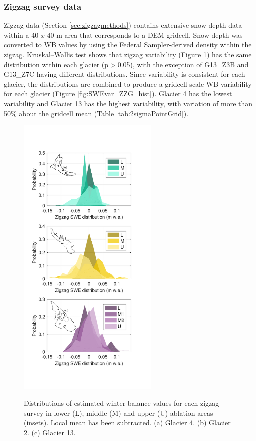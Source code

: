 \documentclass{sfuthesis}
\begin{document}
\subsubsection{Zigzag survey data}
Zigzag data (Section \ref{sec:zigzagmethods}) contains extensive snow depth data within a 40 $x$ 40 m area that corresponds to a DEM gridcell. Snow depth was converted to WB values by using the Federal Sampler-derived density within the zigzag. Kruskal--Wallis test shows that zigzag variability (Figure \ref{fig:SWEvar_ZZ_hist}) has the same distribution within each glacier (p$>$0.05), with the exception of G13\_Z3B and G13\_Z7C having different distributions. Since variability is consistent for each glacier, the distributions are combined to produce a gridcell-scale WB variability for each glacier (Figure \ref{fig:SWEvar_ZZG_hist}). Glacier 4 has the lowest variability and Glacier 13 has the highest variability, with variation of more than 50\% about the gridcell mean (Table  \ref{tab:2sigmaPointGrid}). 

\begin{figure}[H]
	\centering
	\includegraphics[width =0.6\textwidth]{ZigzagHistogram.pdf}\\
	\caption{Distributions of estimated winter-balance values for each zigzag survey in lower (L), middle (M) and upper (U) ablation areas (insets). Local mean has been subtracted. (a) Glacier 4. (b) Glacier 2. (c) Glacier 13.}
	\label{fig:SWEvar_ZZ_hist}
\end{figure}
\end{document}
